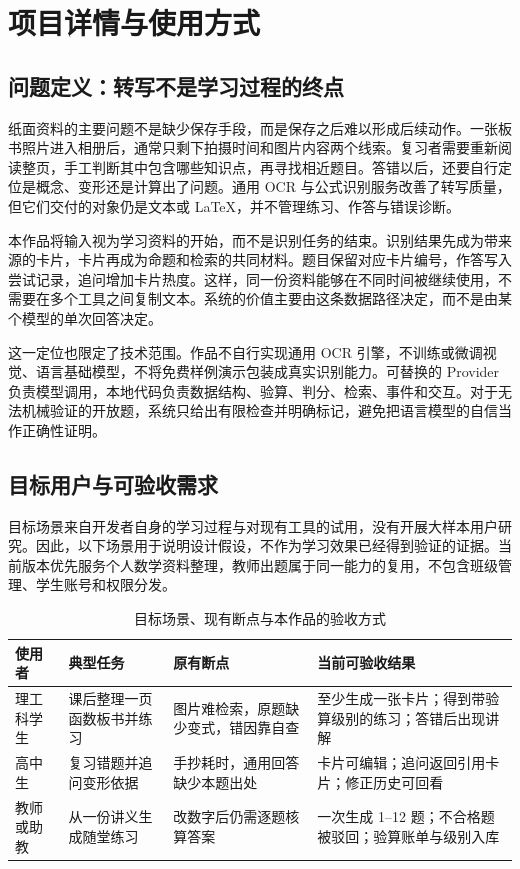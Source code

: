 \clearpage
\section{项目详情与使用方式}

\subsection{问题定义：转写不是学习过程的终点}

纸面资料的主要问题不是缺少保存手段，而是保存之后难以形成后续动作。一张板书照片进入相册后，通常只剩下拍摄时间和图片内容两个线索。复习者需要重新阅读整页，手工判断其中包含哪些知识点，再寻找相近题目。答错以后，还要自行定位是概念、变形还是计算出了问题。通用 OCR 与公式识别服务改善了转写质量，但它们交付的对象仍是文本或 LaTeX，并不管理练习、作答与错误诊断。

本作品将输入视为学习资料的开始，而不是识别任务的结束。识别结果先成为带来源的卡片，卡片再成为命题和检索的共同材料。题目保留对应卡片编号，作答写入尝试记录，追问增加卡片热度。这样，同一份资料能够在不同时间被继续使用，不需要在多个工具之间复制文本。系统的价值主要由这条数据路径决定，而不是由某个模型的单次回答决定。

这一定位也限定了技术范围。作品不自行实现通用 OCR 引擎，不训练或微调视觉、语言基础模型，不将免费样例演示包装成真实识别能力。可替换的 Provider 负责模型调用，本地代码负责数据结构、验算、判分、检索、事件和交互。对于无法机械验证的开放题，系统只给出有限检查并明确标记，避免把语言模型的自信当作正确性证明。

\subsection{目标用户与可验收需求}

目标场景来自开发者自身的学习过程与对现有工具的试用，没有开展大样本用户研究。因此，以下场景用于说明设计假设，不作为学习效果已经得到验证的证据。当前版本优先服务个人数学资料整理，教师出题属于同一能力的复用，不包含班级管理、学生账号和权限分发。

\begin{table}[H]
\centering\footnotesize
\caption{目标场景、现有断点与本作品的验收方式}
\begin{tabularx}{\textwidth}{@{}L{2.4cm}L{4.3cm}Y L{4.0cm}@{}}
\toprule
\textbf{使用者} & \textbf{典型任务} & \textbf{原有断点} & \textbf{当前可验收结果} \\
\midrule
理工科学生 & 课后整理一页函数板书并练习 & 图片难检索，原题缺少变式，错因靠自查 & 至少生成一张卡片；得到带验算级别的练习；答错后出现讲解 \\
高中生 & 复习错题并追问变形依据 & 手抄耗时，通用回答缺少本题出处 & 卡片可编辑；追问返回引用卡片；修正历史可回看 \\
教师或助教 & 从一份讲义生成随堂练习 & 改数字后仍需逐题核算答案 & 一次生成 1--12 题；不合格题被驳回；验算账单与级别入库 \\
\bottomrule
\end{tabularx}
\end{table}

